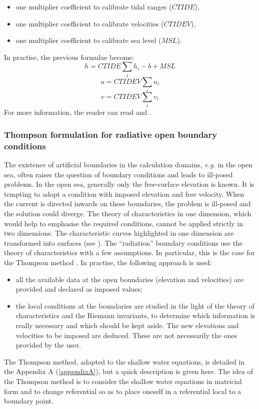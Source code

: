 \begin{itemize}
\item one multiplier coefficient to calibrate tidal ranges ($CTIDE$),
\item one multiplier coefficient to calibrate velocities ($CTIDEV$),
\item one multiplier coefficient to calibrate sea level ($MSL$).
\end{itemize}

In practise, the previous formulae become:
\begin{equation}
h = CTIDE \sum_{i} h_{i} - b + MSL
\end{equation}
\begin{equation}
u = CTIDEV \sum_{i} u_{i}
\end{equation}
\begin{equation}
v = CTIDEV \sum_{i} v_{i}
\end{equation}
For more information, the reader can read \cite{phammareev6p2} and
\cite{phamlyard}.


\subsubsection{Thompson formulation for radiative open boundary conditions}\label{thompson}

The existence of artificial boundaries in the calculation domains, \textit{e.g.}
in the open sea, often raises the question of boundary conditions and
leads to ill-posed problems. In the open sea, generally only the free-surface
elevation is known. It is tempting to adopt a condition with
imposed elevation and free velocity. When the current is directed
inwards on these boundaries, the problem is ill-posed
and the solution could diverge. The theory of characteristics in one dimension,
which would help to emphasise the required conditions, cannot be applied
strictly in two dimensions. The characteristic curves highlighted
in one dimension are transformed into surfaces (see \cite{daubert67}). The ``radiation''
boundary conditions use the theory of characteristics with a few assumptions.
In particular, this is the case for the Thompson method \cite{thompson}.
In practise, the following approach is used:
\begin{itemize}
\item all the available data at the open boundaries (elevation and velocities)
  are provided and declared as imposed values;
\item the local conditions at the boundaries are studied in the light of the theory of characteristics
  and the Riemann invariants, to determine which information is really necessary
  and which should be kept aside. The new elevations and velocities to be imposed are deduced.
  These are not necessarily the ones provided by the user.
\end{itemize}
The Thompson method, adapted to the shallow water equations, is detailed
in the Appendix A (\ref{appendixA}), but a quick description is given here.
The idea of the Thompson method is to consider the shallow water equations
in matricial form and to change referential so as to
place oneself in a referential local to a boundary point.

